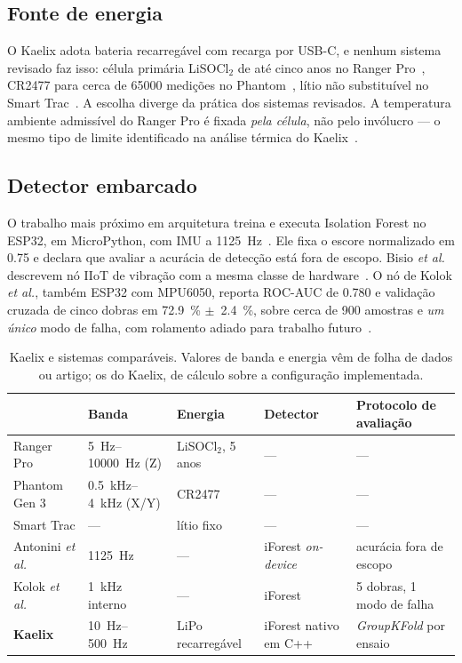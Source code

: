 \documentclass[10pt,a4paper,landscape,twocolumn]{article}
\begin{document}
\subsection{Fonte de energia}

O Kaelix adota bateria recarregável com recarga por USB-C, e nenhum sistema revisado faz
isso: célula primária LiSOCl$_2$ de até cinco anos no Ranger Pro~\cite{bentlynevada2025},
CR2477 para cerca de \num{65000} medições no Phantom~\cite{erbessd2025}, lítio não
substituível no Smart Trac~\cite{tractian2022}. A escolha diverge da prática dos sistemas
revisados. A temperatura ambiente admissível do Ranger Pro é fixada \emph{pela célula}, não
pelo invólucro --- o mesmo tipo de limite identificado na análise térmica do
Kaelix~\cite{bentlynevada2025}.

\subsection{Detector embarcado}

O trabalho mais próximo em arquitetura treina e executa Isolation Forest no
ESP32, em MicroPython, com IMU a \SI{1125}{\hertz}~\cite{antonini2023}. Ele fixa o escore
normalizado em \num{0,75} e declara que avaliar a acurácia de detecção está fora de
escopo. Bisio \emph{et al.} descrevem nó IIoT de vibração com a mesma classe de
hardware~\cite{bisio2025}. O nó de Kolok \emph{et al.}, também ESP32 com MPU6050, reporta
ROC-AUC de \num{0,780} e validação cruzada de cinco dobras em \SI{72,9}{\percent}
$\pm$~\SI{2,4}{\percent}, sobre cerca de \num{900} amostras e \emph{um único} modo de
falha, com rolamento adiado para trabalho futuro~\cite{kolok2025}.

\begin{table}[!t]
\centering
\caption{Kaelix e sistemas comparáveis. Valores de banda e energia vêm de folha de dados
ou artigo; os do Kaelix, de cálculo sobre a configuração implementada.}
\footnotesize
\begin{tabular}{@{}lllll@{}}
\toprule
 & Banda & Energia & Detector & Protocolo de avaliação \\
\midrule
Ranger Pro & \SIrange{5}{10000}{\hertz} (Z) & LiSOCl$_2$, 5 anos & --- & --- \\
Phantom Gen 3 & \SIrange{0,5}{4}{\kilo\hertz} (X/Y) & CR2477 & --- & --- \\
Smart Trac & --- & lítio fixo & --- & --- \\
Antonini \emph{et al.} & \SI{1125}{\hertz} & --- & iForest \emph{on-device} & acurácia fora de escopo \\
Kolok \emph{et al.} & \SI{1}{\kilo\hertz} interno & --- & iForest & 5 dobras, 1 modo de falha \\
\textbf{Kaelix} & \SIrange{10}{500}{\hertz} & LiPo recarregável & iForest nativo em C++ & \textit{GroupKFold} por ensaio \\
\bottomrule
\end{tabular}
\end{table}
\end{document}
